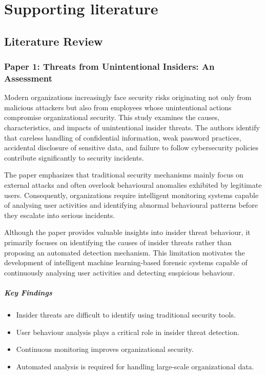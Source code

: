 
\chapter{Supporting literature}
\label{chap:literature}

\section{Literature Review}

\subsection*{Paper 1: Threats from Unintentional Insiders: An Assessment}
Modern organizations increasingly face security risks originating not only from malicious attackers but also from employees whose unintentional actions compromise organizational security. This study examines the causes, characteristics, and impacts of unintentional insider threats. The authors identify that careless handling of confidential information, weak password practices, accidental disclosure of sensitive data, and failure to follow cybersecurity policies contribute significantly to security incidents.

The paper emphasizes that traditional security mechanisms mainly focus on external attacks and often overlook behavioural anomalies exhibited by legitimate users. Consequently, organizations require intelligent monitoring systems capable of analysing user activities and identifying abnormal behavioural patterns before they escalate into serious incidents.

Although the paper provides valuable insights into insider threat behaviour, it primarily focuses on identifying the causes of insider threats rather than proposing an automated detection mechanism. This limitation motivates the development of intelligent machine learning-based forensic systems capable of continuously analysing user activities and detecting suspicious behaviour.

\paragraph{Key Findings}
\begin{itemize}
  \item Insider threats are difficult to identify using traditional security tools.
  \item User behaviour analysis plays a critical role in insider threat detection.
  \item Continuous monitoring improves organizational security.
  \item Automated analysis is required for handling large-scale organizational data.
\end{itemize}
